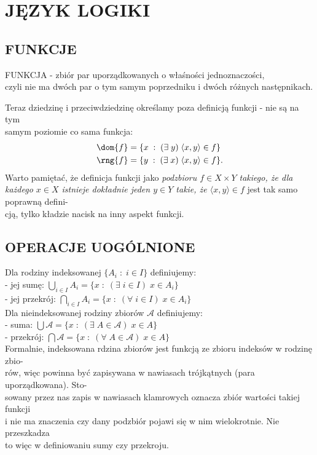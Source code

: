 \section{JĘZYK LOGIKI}

\subsection{FUNKCJE}
\begin{center}\large
    {\color{def}FUNKCJA} - zbiór par uporządkowanych o właśności jednoznaczości,\\
    czyli nie ma dwóch par o tym samym poprzedniku i dwóch różnych następnikach.
\end{center}\bigskip
Teraz dziedzinę i przeciwdziedzinę określamy poza definicją funkcji - nie są na tym \\samym poziomie co sama funkcja:
\begin{align*}
    \dom{f}&=\{x\;:\;(\exists\;y)\;\langle x,y\rangle\in f\}\\
    \rng{f}&=\{y\;:\;(\exists\;x)\;\langle x,y\rangle\in f\}.
\end{align*}
Warto pamiętać, że {\color{acc}definicja funkcji} jako \emph{podzbioru $f\in X\times Y$ takiego, że dla każdego $x\in X$ istnieje dokładnie jeden $y\in Y$ takie, że $\langle x,y\rangle \in f$} jest tak samo poprawną defini-\\cją, tylko {\color{emp}kładzie nacisk na inny aspekt} funkcji.

\subsection{OPERACJE UOGÓLNIONE}
Dla {\color{def}rodziny indeksowanej} $\{A_i\;:\;i\in I\}$ definiujemy:\smallskip\\
    \indent - jej sumę: $\bigcup\limits_{i\in I}A_i = \{x\;:\;(\exists\;i\in I)\;x\in A_i\}$\smallskip\\
    \indent - jej przekrój: $\bigcap\limits_{i\in I}A_i=\{x\;:\;(\forall\;i\in I)\;x\in A_i\}$\medskip\\
Dla {\color{def}nieindeksowanej rodziny zbiorów} $\mathcal{A}$ definiujemy:\smallskip\\
    \indent - suma: $\bigcup\mathcal{A} = \{x\;:\;(\exists\;A\in\mathcal{A})\;x\in A\}$\smallskip\\
    \indent - przekrój: $\bigcap\mathcal{A}=\{x\;:\;(\forall\;A\in\mathcal{A})\;x\in A\}$\medskip\\
Formalnie, indeksowana rdzina zbiorów jest funkcją ze zbioru indeksów w rodzinę zbio-\\rów, więc powinna być zapisywana w nawiasach trójkątnych (para uporządkowana). Sto-\\sowany przez nas zapis w nawiasach klamrowych oznacza zbiór wartości takiej funkcji \\i nie ma znaczenia czy dany podzbiór pojawi się w nim wielokrotnie. Nie przeszkadza \\to więc w definiowaniu sumy czy przekroju.\bigskip\\

